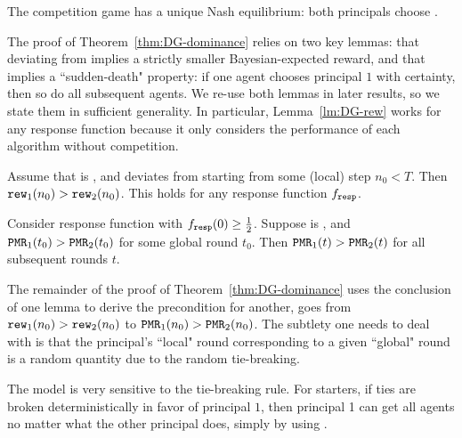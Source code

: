 \begin{corollary}\label{cor:DG-dominance}
The competition game has a unique Nash equilibrium: both principals choose \DynGreedy. 
\end{corollary}

The proof of Theorem~\ref{thm:DG-dominance} relies on two key lemmas: that deviating from \DynGreedy implies a strictly smaller Bayesian-expected reward, and that \HardMax implies a ``sudden-death" property: if one agent chooses principal $1$ with certainty, then so do all subsequent agents. We re-use both lemmas in later results, so we state them in sufficient generality. In particular, Lemma~\ref{lm:DG-rew} works for any response function because it only considers the performance of each algorithm without competition.


\begin{lemma}\label{lm:DG-rew}
Assume that \alg[1] is \DynGreedy, and \alg[2] deviates from \DynGreedy starting from some (local) step $n_0<T$. Then $\mathtt{rew}_1(n_0)>\mathtt{rew}_2(n_0)$. This holds for any response function $f_{\mathtt{resp}}$.
\end{lemma}


\begin{lemma}\label{lm:DG-sudden}
Consider \HardMax response function with $f_{\mathtt{resp}}(0)\geq\tfrac12$.
Suppose \alg[1] is \bmonotone, and $\mathtt{PMR}_1(t_0)>\mathtt{PMR}_2(t_0)$ for some global round $t_0$. Then $\mathtt{PMR}_1(t)>\mathtt{PMR}_2(t)$ for all subsequent rounds $t$.
\end{lemma}

The remainder of the proof of Theorem~\ref{thm:DG-dominance} uses the conclusion of one lemma to derive the precondition for another, \ie goes from $\mathtt{rew}_1(n_0)>\mathtt{rew}_2(n_0)$ to $\mathtt{PMR}_1(n_0)>\mathtt{PMR}_2(n_0)$. The subtlety one needs to deal with is that the principal's ``local" round corresponding to a given ``global" round is a random quantity due to the random tie-breaking.


The \HardMax model is very sensitive to the tie-breaking rule. For starters, if ties are  broken deterministically in favor of principal $1$, then principal 1 can get all agents no matter what the other principal does, simply by using \StaticGreedy.

